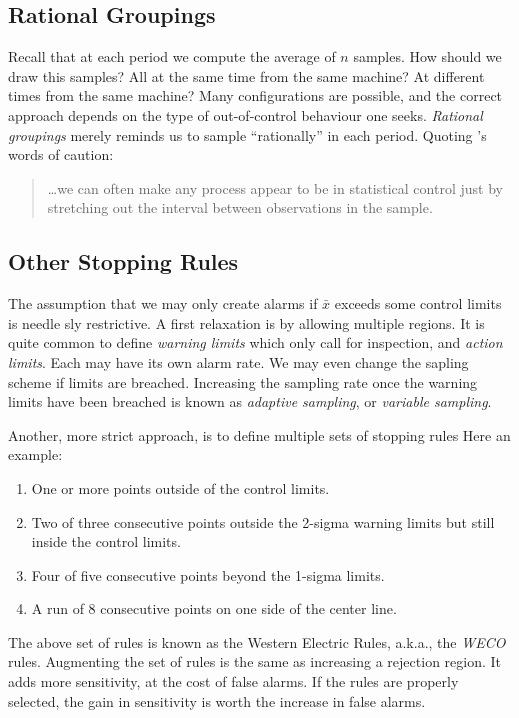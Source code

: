 \subsection{Rational Groupings}
\label{sec:rational_grouping}
Recall that at each period we compute the average of $n$ samples. 
How should we draw this samples? All at the same time from the same machine?
At different times from the same machine?
Many configurations are possible, and the correct approach depends on the type of out-of-control behaviour one seeks. 
\emph{Rational groupings} merely reminds us to sample ``rationally'' in each period. 
Quoting \cite{montgomery_introduction_2007}'s words of caution:
\begin{quotation}
\dots we can often make any process appear to be in statistical control just by stretching out the interval between observations in the sample.
\end{quotation}






\subsection{Other Stopping Rules}
\label{sec:stopping_rules}

The assumption that we may only create alarms if $\bar{x}$ exceeds some control limits is needle sly restrictive.
A first relaxation is by allowing multiple regions.
It is quite common to define \emph{warning limits} which only call for inspection, and \emph{action limits}. Each may have its own alarm rate.
We may even change the sapling scheme if limits are breached. Increasing the sampling rate once the warning limits have been breached is known as \emph{adaptive sampling}, or \emph{variable sampling}.


Another, more strict approach, is to define multiple sets of stopping rules
Here an example:
\begin{enumerate}
\item One or more points outside of the control limits.
\item Two of three consecutive points outside the 2-sigma warning limits but still inside the control limits.
\item Four of five consecutive points beyond the 1-sigma limits.
\item A run of 8 consecutive points on one side of the center line.
\end{enumerate}
The above set of rules is known as the Western Electric Rules, a.k.a., the \emph{WECO} rules.
Augmenting the set of rules is the same as increasing a rejection region. It adds more sensitivity, at the cost of false alarms. If the rules are properly selected, the gain in sensitivity is worth the increase in false alarms.

